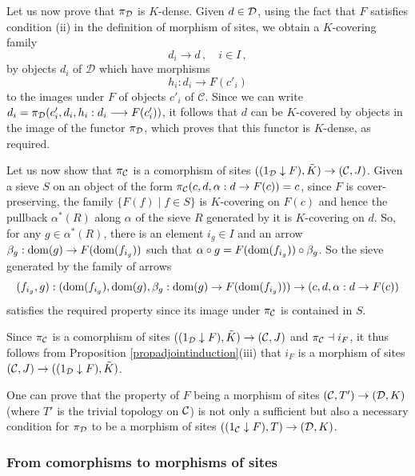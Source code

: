 \documentclass[a4paper,12pt]{article}
\begin{document}
\begin{proofs}
	Let us now prove that $\pi_{\cal D}$ is $K$-dense. Given $d\in {\cal D}$, using the fact that $F$ satisfies condition (ii) in the definition of morphism of sites, we obtain a $K$-covering family 
	$$
	d_i \longrightarrow d \, , \quad i \in I \, ,
	$$
	by objects $d_i$ of ${\mathcal D}$ which have morphisms 
	$$
	h_{i}:d_i \longrightarrow F(c'_i)
	$$
	to the images under $F$ of objects $c'_i$ of ${\mathcal C}$. Since we can write $d_{i}=\pi_{\cal D}(c'_i, d_{i}, h_{i}:d_i \longrightarrow F(c'_i))$, it follows that $d$ can be $K$-covered by objects in the image of the functor $\pi_{\cal D}$, which proves that this functor is $K$-dense, as required.
	
	Let us now show that $\pi_{\cal C}$ is a comorphism of sites $((1_{\cal D}\downarrow F), \tilde{K}) \to ({\cal C}, J)$. Given a sieve $S$ on an object of the form $\pi_{\cal C}(c, d, \alpha:d\to F(c))=c$, since $F$ is cover-preserving, the family $\{F(f) \mid f\in S\}$ is $K$-covering on $F(c)$ and hence the pullback $\alpha^{\ast}(R)$ along $\alpha$ of the sieve $R$ generated by it is $K$-covering on $d$. So, for any $g\in \alpha^{\ast}(R)$, there is an element $i_{g}\in I$ and an arrow $\beta_{g}:\textup{dom}(g)\to F(\textup{dom}(f_{i_{g}}))$ such that $\alpha \circ g=F(\textup{dom}(f_{i_{g}}))\circ \beta_{g}$. So the sieve generated by the family of arrows 
	\[
	(f_{i_{g}}, g):(\textup{dom}(f_{i_{g}}), \textup{dom}(g), \beta_{g}: \textup{dom}(g) \to F(\textup{dom}(f_{i_{g}}))) \to (c, d, \alpha:d\to F(c))
	\] 
	satisfies the required property since its image under $\pi_{\cal C}$ is contained in $S$.  
	
	Since $\pi_{\cal C}$ is a comorphism of sites $((1_{\cal D}\downarrow F), \tilde{K}) \to ({\cal C}, J)$ and $\pi_{\cal C} \dashv i_{F}$, it thus follows from Proposition \ref{propadjointinduction}(iii) that $i_{F}$ is a morphism of sites $({\cal C}, J)\to ((1_{\cal D}\downarrow F), \tilde{K})$.    
	
	
\end{proofs}

\begin{remark}\label{remcorrelationmorphisms}
	One can prove that the property of $F$ being a morphism of sites $({\cal C}, T') \to ({\cal D}, K)$ (where $T'$ is the trivial topology on $\cal C$) is not only a sufficient but also a necessary condition for $\pi_{\cal D}$ to be a morphism of sites $((1_{\cal C}\downarrow F), T) \to ({\cal D}, K)$. 
\end{remark}

\subsubsection{From comorphisms to morphisms of sites}
\end{document}
